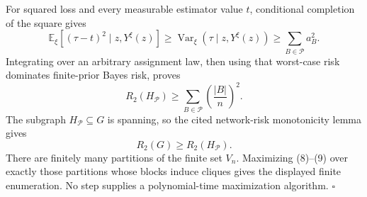 For squared loss and every measurable estimator value \(t\), conditional completion of the square gives
\[
\mathbb E_{\xi}[(\tau-t)^2\mid z,Y^{\xi}(z)]
\geq\operatorname{Var}_{\xi}(\tau\mid z,Y^{\xi}(z))
\geq\sum_{B\in\mathcal P}a_B^2.
\tag{7}
\]
Integrating over an arbitrary assignment law, then using that worst-case risk dominates finite-prior Bayes risk, proves
\[
R_2(H_{\mathcal P})\geq
\sum_{B\in\mathcal P}\left(\frac{|B|}{n}\right)^2.
\tag{8}
\]
The subgraph \(H_{\mathcal P}\subseteq G\) is spanning, so the cited network-risk monotonicity lemma gives
\[
R_2(G)\geq R_2(H_{\mathcal P}).
\tag{9}
\]
There are finitely many partitions of the finite set \(V_n\).  Maximizing (8)--(9) over exactly those partitions whose blocks induce cliques gives the displayed finite enumeration.  No step supplies a polynomial-time maximization algorithm. \(\square\)